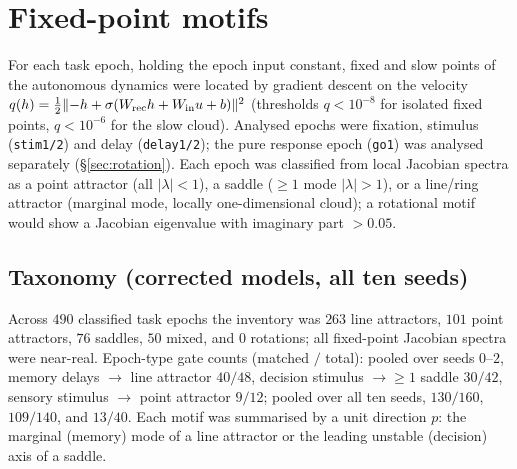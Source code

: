 \documentclass[11pt]{article}
\begin{document}
\section{Fixed-point motifs}
\label{sec:motifs}
For each task epoch, holding the epoch input constant, fixed and slow points of the autonomous
dynamics were located by gradient descent on the velocity
$q(h)=\tfrac12\lVert -h+\sigma(W_{\rm rec}h+W_{\rm in}u+b)\rVert^{2}$ (thresholds $q<10^{-8}$ for
isolated fixed points, $q<10^{-6}$ for the slow cloud). Analysed epochs were fixation, stimulus
(\texttt{stim1/2}) and delay (\texttt{delay1/2}); the pure response epoch (\texttt{go1}) was
analysed separately (\S\ref{sec:rotation}). Each epoch was classified from local Jacobian
spectra as a point attractor (all $|\lambda|<1$), a saddle ($\geq1$ mode $|\lambda|>1$), or a
line/ring attractor (marginal mode, locally one-dimensional cloud); a rotational motif would show
a Jacobian eigenvalue with imaginary part $>0.05$.

\subsection{Taxonomy (corrected models, all ten seeds)}
Across $490$ classified task epochs the inventory was $263$ line attractors, $101$ point
attractors, $76$ saddles, $50$ mixed, and $0$ rotations; all fixed-point Jacobian spectra were
near-real. Epoch-type gate counts (matched $/$ total): pooled over seeds $0$--$2$, memory delays
$\to$ line attractor $40/48$, decision stimulus $\to\geq1$ saddle $30/42$, sensory stimulus
$\to$ point attractor $9/12$; pooled over all ten seeds, $130/160$, $109/140$, and $13/40$. Each
motif was summarised by a unit direction $p$: the marginal (memory) mode of a line attractor or
the leading unstable (decision) axis of a saddle.
\end{document}
